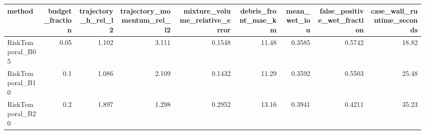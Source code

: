 \begin{tabular}{lrrrrrrrr}
\toprule
method & budget_fraction & trajectory_h_rel_l2 & trajectory_momentum_rel_l2 & mixture_volume_relative_error & debris_front_mae_km & mean_wet_iou & false_positive_wet_fraction & case_wall_runtime_seconds \\
\midrule
RiskTemporal_B05 & 0.05 & 1.102 & 3.111 & 0.1548 & 11.48 & 0.3585 & 0.5742 & 18.82 \\
RiskTemporal_B10 & 0.1 & 1.086 & 2.109 & 0.1432 & 11.29 & 0.3592 & 0.5503 & 25.48 \\
RiskTemporal_B20 & 0.2 & 1.897 & 1.298 & 0.2952 & 13.16 & 0.3941 & 0.4211 & 35.23 \\
\bottomrule
\end{tabular}
